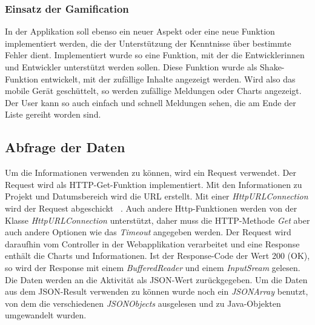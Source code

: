 \subsubsection{Einsatz der Gamification}
In der Applikation soll ebenso ein neuer Aspekt oder eine neue Funktion implementiert werden, die der Unterstützung der Kenntnisse über bestimmte Fehler dient. Implementiert wurde so eine Funktion, mit der die Entwicklerinnen und Entwickler unterstützt werden sollen. Diese Funktion wurde als Shake-Funktion entwickelt, mit der zufällige Inhalte angezeigt werden. Wird also das mobile Gerät geschüttelt, so werden zufällige Meldungen oder Charts angezeigt. Der User kann so auch einfach und schnell Meldungen sehen, die am Ende der Liste gereiht worden sind.
\subsection{Abfrage der Daten}
Um die Informationen verwenden zu können, wird ein Request verwendet. Der Request wird als HTTP-Get-Funktion implementiert. Mit den Informationen zu Projekt und Datumsbereich wird die URL erstellt. Mit einer \textit{HttpURLConnection} wird der Request abgeschickt ~\parencite{liu2017web}. Auch andere Http-Funktionen werden von der Klasse \textit{HttpURLConnection} unterstützt, daher muss die HTTP-Methode \textit{Get} aber auch andere Optionen wie das \textit{Timeout} angegeben werden. Der Request wird daraufhin vom Controller in der Webapplikation verarbeitet und eine Response enthält die Charts und Informationen. Ist der Response-Code der Wert 200 (OK), so wird der Response mit einem \textit{BufferedReader} und einem \textit{InputSream} gelesen. Die Daten werden an die Aktivität als JSON-Wert zurückgegeben. Um die Daten aus dem JSON-Result verwenden zu können wurde noch ein \textit{JSONArray} benutzt, von dem die verschiedenen \textit{JSONObjects} ausgelesen und zu Java-Objekten umgewandelt wurden. 
